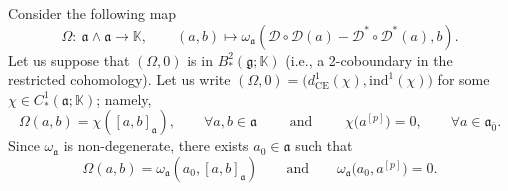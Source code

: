\documentclass[pdftex]{sigma}
\numberwithin{equation}{section}
\begin{document}
Consider the following map
\[
\Omega\colon \ \mathfrak{a}\wedge \mathfrak{a} \rightarrow \mathbb{K},\qquad (a,b) \mapsto \omega_\mathfrak{a}( {\mathscr D} \circ {\mathscr D}(a) - {\mathscr D}^* \circ {\mathscr D}^*(a) , b).
\]
Let us suppose that $(\Omega, 0)$ is in $B^2_*(\mathfrak{g};\mathbb{K})$ (i.e., a 2-coboundary in the restricted cohomology). Let us write $(\Omega,0)= \bigl(d^1_{\mathrm{CE}} (\chi), \mathrm{ind}^1(\chi) \bigr)$ for some $\chi\in C^1_*(\mathfrak{a}; \mathbb{K})$; namely,
\[
\Omega(a,b)=\chi([a,b]_\mathfrak{a}),\qquad \forall a,b\in \mathfrak{a} \qquad \text{ and } \qquad \chi\bigl(a^{[p]}\bigr)=0,\qquad \forall a\in \mathfrak{a}_{\bar 0}.
\]
Since $\omega_\mathfrak{a}$ is non-degenerate, there exists $a_0\in \mathfrak{a}$ such that
\begin{equation}
\label{azero}
\Omega(a,b)=\omega_\mathfrak{a}(a_0,[a,b]_\mathfrak{a})\qquad \text{and} \qquad \omega_\mathfrak{a}\bigl(a_0,a^{[p]}\bigr)=0.
\end{equation}
\end{document}
